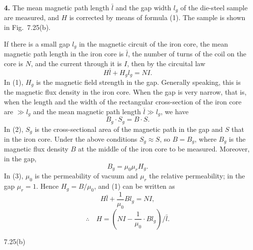 \textbf{4.} The mean magnetic path length $\bar{l}$ and the gap width $l_g$ of the die-steel sample are measured, and $H$ is corrected by means of formula (1). The sample is shown in Fig.~7.25(b).

If there is a small gap $l_g$ in the magnetic circuit of the iron core, the mean magnetic path length in the iron core is $\bar{l}$, the number of turns of the coil on the core is $N$, and the current through it is $I$, then by the circuital law
\begin{equation}
H\bar{l}+H_gl_g=NI. \tag{1}
\end{equation}
In (1), $H_g$ is the magnetic field strength in the gap. Generally speaking, this is the magnetic flux density in the iron core. When the gap is very narrow, that is, when the length and the width of the rectangular cross-section of the iron core are $\gg l_g$ and the mean magnetic path length $\bar{l}\gg l_g$, we have
\begin{equation}
B_g\cdot S_g=B\cdot S. \tag{2}
\end{equation}
In (2), $S_g$ is the cross-sectional area of the magnetic path in the gap and $S$ that in the iron core. Under the above conditions $S_g\approx S$, so $B=B_g$, where $B_g$ is the magnetic flux density $B$ at the middle of the iron core to be measured. Moreover, in the gap,
\begin{equation}
B_g=\mu_0\mu_rH_g. \tag{3}
\end{equation}
In (3), $\mu_0$ is the permeability of vacuum and $\mu_r$ the relative permeability; in the gap $\mu_r=1$. Hence $H_g=B/\mu_0$, and (1) can be written as
\begin{equation}
H\bar{l}+\frac{1}{\mu_0}Bl_g=NI, \tag{4}
\end{equation}
\begin{equation}
\therefore\quad H=\left(NI-\frac{1}{\mu_0}\cdot Bl_g\right)\Big/\bar{l}. \tag{5}
\end{equation}

\begin{figbox}{7.25(b)}
\end{figbox}

